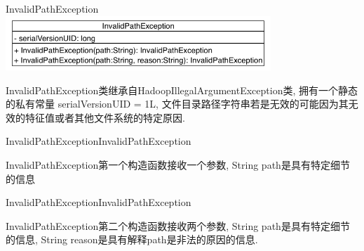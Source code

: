 \begin{XeClass}{InvalidPathException}
\includegraphics[width=10cm]{cdig/InvalidPathException.png}
     
 InvalidPathException类继承自HadoopIllegalArgumentException类,
 拥有一个静态的私有常量 serialVersionUID = 1L,
 文件目录路径字符串若是无效的可能因为其无效的特征值或者其他文件系统的特定原因.

    \begin{XeMethod}{\XePublic}{InvalidPathException}{InvalidPathException}
         
 InvalidPathException第一个构造函数接收一个参数,
 String path是具有特定细节的信息

    \end{XeMethod}

    \begin{XeMethod}{\XePublic}{InvalidPathException}{InvalidPathException}
         
 InvalidPathException第二个构造函数接收两个参数,
 String path是具有特定细节的信息,
 String reason是具有解释path是非法的原因的信息.

    \end{XeMethod}

\end{XeClass}

